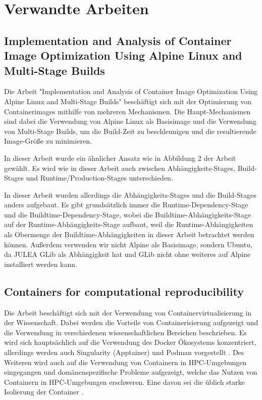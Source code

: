 \chapter{Verwandte Arbeiten}
\label{cha:related-work}

\section{Implementation and Analysis of Container Image Optimization Using Alpine Linux and Multi-Stage Builds \cite{fachrudinImplementationAnalysisContainer2025}}

Die Arbeit "Implementation and Analysis of Container Image Optimization Using Alpine Linux and Multi-Stage Builds" beschäftigt sich mit der Optimierung von Containerimages mithilfe von mehreren Mechanismen. Die Haupt-Mechanismen sind dabei die Verwendung von Alpine Linux als Basisimage und die Verwendung von Multi-Stage Builds, um die Build-Zeit zu beschleunigen und die resultierende Image-Größe zu minimieren. 

In dieser Arbeit wurde ein ähnlicher Ansatz wie in Abbildung 2 \cite[Vgl. S. 11]{fachrudinImplementationAnalysisContainer2025} der Arbeit gewählt. Es wird wie in dieser Arbeit auch zwischen Abhängigkeits-Stages, Build-Stages und Runtime/Production-Stages unterschieden. 


In dieser Arbeit wurden allerdings die Abhängigkeits-Stages und die Build-Stages anders aufgebaut. Es gibt grundsätzlich immer die Runtime-Dependency-Stage und die Buildtime-Dependency-Stage, wobei die Buildtime-Abhängigkeits-Stage auf der Runtime-Abhängigkeits-Stage aufbaut, weil die Runtime-Abhängigkeiten als Obermenge der Buildtime-Abhängigkeiten in dieser Arbeit betrachtet werden können. Außerdem verwenden wir nicht Alpine als Basisimage, sondern Ubuntu, da JULEA GLib als Abhängigkeit hat und GLib nicht ohne weiteres auf Alpine installiert werden kann.

\section{Containers for computational reproducibility \cite{moreauContainersComputationalReproducibility2023}}

Die Arbeit beschäftigt sich mit der Verwendung von Containervirtualisierung in der Wissenschaft. Dabei werden die Vorteile von Containerisierung aufgezeigt \cite[Vgl. S. 4ff]{moreauContainersComputationalReproducibility2023} und die Verwendung in verschiedenen wissenschaftlichen Bereichen \cite[Vgl. S. 6ff]{moreauContainersComputationalReproducibility2023} beschrieben. Es wird sich hauptsächlich auf die Verwendung des Docker Ökosystems konzentriert, allerdings werden auch Singularity (Apptainer) und Podman vorgestellt \cite[Vgl. S. 7]{moreauContainersComputationalReproducibility2023}. Des Weiteren wird auch auf die Verwendung von Containern in HPC-Umgebungen eingegangen und domänenspezifische Probleme aufgezeigt, welche das Nutzen von Containern in HPC-Umgebungen erschweren. Eine davon sei die üblich starke Isolierung der Container \cite[Vgl. S. 12f]{moreauContainersComputationalReproducibility2023}.

